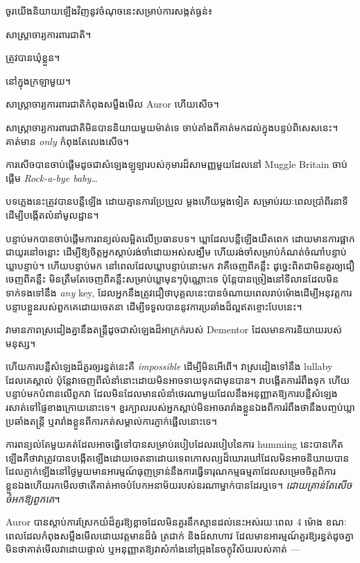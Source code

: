 ចូរយើងនិយាយឡើងវិញនូវចំណុចនេះសម្រាប់ការសង្កត់ធ្ងន់៖

សាស្ត្រាចារ្យការពារជាតិ។

ត្រូវបានឃុំខ្លួន។

នៅក្នុងក្រឡាមួយ។

សាស្ត្រាចារ្យ​ការពារ​ជាតិ​កំពុង​សម្លឹង​មើល Auror ហើយ​សើច។

សាស្ត្រាចារ្យ​ការពារ​ជាតិ​មិន​បាន​និយាយ​មួយ​ម៉ាត់​ទេ ចាប់​តាំង​ពី​គាត់​មក​ដល់​ក្នុង​បន្ទប់​ពិសេស​នេះ។ គាត់មាន \emph{ only} កំពុងតែលេងសើច។

ការ​សើច​បាន​ចាប់​ផ្ដើម​ដូច​ជា​សំឡេង​ឡូឡា​របស់​កុមារ​ដ៏​សាមញ្ញ​មួយ​ដែល​នៅ Muggle Britain ចាប់​ផ្ដើម \emph{Rock-a-bye baby…}

បទភ្លេងនេះត្រូវបានបន្លឺឡើង ដោយគ្មានការប្រែប្រួល ម្តងហើយម្តងទៀត សម្រាប់រយៈពេលប្រាំពីរនាទី ដើម្បីបង្កើតលំនាំមូលដ្ឋាន។

បន្ទាប់មកបានចាប់ផ្តើមការពន្យល់លម្អិតលើប្រធានបទ។ ឃ្លាដែលបន្លឺឡើងយឺតពេក ដោយមានការផ្អាកជាយូរនៅចន្លោះ ដើម្បីឱ្យចិត្តអ្នកស្តាប់រង់ចាំដោយអស់សង្ឃឹម ហើយរង់ចាំសម្រាប់កំណត់ចំណាំបន្ទាប់ ឃ្លាបន្ទាប់។ ហើយបន្ទាប់មក នៅពេលដែលឃ្លាបន្ទាប់នោះមក វាគឺចេញពីគន្លឹះ ដូច្នេះពិតជាមិនគួរឲ្យជឿ ចេញពីគន្លឹះ មិនត្រឹមតែចេញពីគន្លឹះសម្រាប់ឃ្លាមុនៗប៉ុណ្ណោះទេ ប៉ុន្តែបានច្រៀងនៅទីលានដែលមិនទាក់ទងទៅនឹង \emph{any} key, ដែលអ្នកនឹងត្រូវជឿថាបុគ្គលនេះបានចំណាយពេលរាប់ម៉ោងដើម្បីអនុវត្តការបន្ទាបខ្លួនរបស់ពួកគេដោយចេតនា ដើម្បីទទួលបាននូវការប្រឆាំងដ៏ល្អឥតខ្ចោះបែបនេះ។

វា​មាន​ភាព​ស្រដៀង​គ្នា​នឹង​តន្ត្រី​ដូច​ជា​សំឡេង​ដ៏​អាក្រក់​របស់ Dementor ដែល​មាន​ការ​និយាយ​របស់​មនុស្ស។

ហើយ​ការ​បន្លឺ​សំឡេង​ដ៏​គួរ​ឲ្យ​រន្ធត់​នេះ​គឺ \emph{impossible} ដើម្បី​មិន​អើពើ។ វាស្រដៀងទៅនឹង lullaby ដែលគេស្គាល់ ប៉ុន្តែវាចេញពីលំនាំនោះដោយមិនអាចទាយទុកជាមុនបាន។ វាបង្កើតការរំពឹងទុក ហើយបន្ទាប់មកបំពានលើពួកវា ដែលមិនដែលមានលំនាំថេរណាមួយដែលនឹងអនុញ្ញាតឱ្យការបន្លឺសំឡេងរសាត់ទៅផ្ទៃខាងក្រោយនោះទេ។ ខួរក្បាលរបស់អ្នកស្តាប់មិនអាចរារាំងខ្លួនឯងពីការរំពឹងថានឹងបញ្ចប់ឃ្លាប្រឆាំងតន្ត្រី ឬរារាំងខ្លួនពីការកត់សម្គាល់ការភ្ញាក់ផ្អើលនោះទេ។

ការពន្យល់តែមួយគត់ដែលអាចធ្វើទៅបានសម្រាប់របៀបដែលរបៀបនៃការ humming នេះបានកើតឡើងគឺថាវាត្រូវបានបង្កើតឡើងដោយចេតនាដោយទេពកោសល្យដ៏ឃោរឃៅដែលមិនអាចនិយាយបានដែលភ្ញាក់ឡើងនៅថ្ងៃមួយមានអារម្មណ៍ធុញទ្រាន់នឹងការធ្វើទារុណកម្មធម្មតាដែលសម្រេចចិត្តពិការខ្លួនឯងហើយរកមើលថាតើគាត់អាចបំបែកអនាម័យរបស់នរណាម្នាក់បានដែរឬទេ។ \emph{ដោយគ្រាន់តែសើចចំអកឱ្យពួកគេ}។

Auror បានស្តាប់ការស្រែកយំដ៏គួរឱ្យខ្លាចដែលមិនគួរនឹកស្មានដល់នេះអស់រយៈពេល 4 ម៉ោង ខណៈពេលដែលកំពុងសម្លឹងមើលដោយវត្តមានដ៏ធំ ត្រជាក់ និងដ៍សាហាវ ដែលមានអារម្មណ៍គួរឱ្យរន្ធត់ដូចគ្នា មិនថាគាត់មើលវាដោយផ្ទាល់ ឬអនុញ្ញាតឱ្យវាសំកាំងនៅជ្រុងនៃចក្ខុវិស័យរបស់គាត់ —

